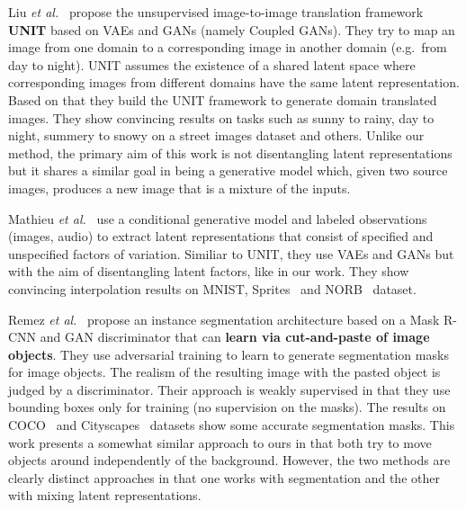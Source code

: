\documentclass[a4paper,12pt]{report}
\begin{document}
Liu \textit{et al.}~\cite{UNIT} propose the unsupervised image-to-image translation framework \textbf{UNIT} based on VAEs and GANs (namely Coupled GANs). They try to map an image from one domain to a corresponding image in another domain (e.g.\ from day to night). UNIT assumes the existence of a shared latent space where corresponding images from different domains have the same latent representation. Based on that they build the UNIT framework to generate domain translated images. They show convincing results on tasks such as sunny to rainy, day to night, summery to snowy on a street images dataset and others. Unlike our method, the primary aim of this work is not disentangling latent representations but it shares a similar goal in being a generative model which, given two source images, produces a new image that is a mixture of the inputs.

Mathieu \textit{et al.}~\cite{1611.03383} use a conditional generative model and labeled observations (images, audio) to extract latent representations that consist of specified and unspecified factors of variation. Similiar to UNIT, they use VAEs and GANs but with the aim of disentangling latent factors, like in our work. They show convincing interpolation results on MNIST, Sprites~\cite{DeepVisAnaMak} and NORB~\cite{NORB} dataset.

Remez \textit{et al.}~\cite{CutAndPaste} propose an instance segmentation architecture based on a Mask R-CNN and GAN discriminator that can \textbf{learn via cut-and-paste of image objects}. They use adversarial training to learn to generate segmentation masks for image objects. The realism of the resulting image with the pasted object is judged by a discriminator. Their approach is weakly supervised in that they use bounding boxes only for training (no supervision on the masks). The results on COCO~\cite{MsCoco} and Cityscapes~\cite{Cityscapes} datasets show some accurate segmentation masks. This work presents a somewhat similar approach to ours in that both try to move objects around independently of the background. However, the two methods are clearly distinct approaches in that one works with segmentation and the other with mixing latent representations.
\end{document}
